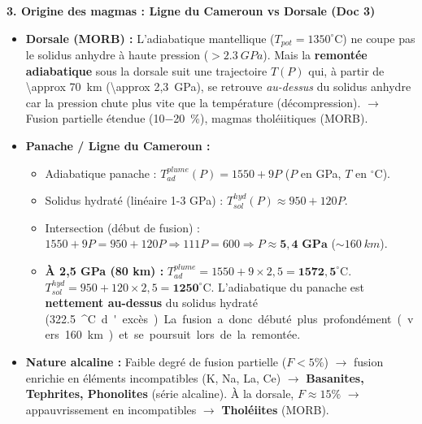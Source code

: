 \documentclass[11pt]{article}
\begin{document}
\begin{exoresolu}
\textbf{3. Origine des magmas : Ligne du Cameroun vs Dorsale (Doc 3)}
\begin{itemize}
    \item \textbf{Dorsale (MORB) :} L'adiabatique mantellique ($T_{pot}=1350^\circ\mathrm{C}$) ne coupe pas le solidus anhydre à haute pression ($> \SI{2,3}{GPa}$). Mais la \textbf{remontée adiabatique} sous la dorsale suit une trajectoire $T(P)$ qui, à partir de \SI{\approx 70}{km} (\SI{\approx 2,3}{GPa}), se retrouve \emph{au-dessus} du solidus anhydre car la pression chute plus vite que la température (décompression). $\rightarrow$ Fusion partielle étendue (\SI{10-20}{\%}), magmas tholéiitiques (MORB).
    \item \textbf{Panache / Ligne du Cameroun :}
    \begin{itemize}
        \item Adiabatique panache : $T_{ad}^{plume}(P) = 1550 + 9P$ ($P$ en GPa, $T$ en $^\circ\mathrm{C}$).
        \item Solidus hydraté (linéaire 1-3 GPa) : $T_{sol}^{hyd}(P) \approx 950 + 120P$.
        \item Intersection (début de fusion) : $1550 + 9P = 950 + 120P \Rightarrow 111P = 600 \Rightarrow P \approx \mathbf{5,4 \text{ GPa}}$ ($\sim \SI{160}{km}$).
        \item \textbf{À 2,5 GPa (80 km) :}
        $T_{ad}^{plume} = 1550 + 9 \times 2,5 = \mathbf{1572,5 ^\circ\mathrm{C}}$.
        $T_{sol}^{hyd} = 950 + 120 \times 2,5 = \mathbf{1250 ^\circ\mathrm{C}}$.
        L'adiabatique du panache est \textbf{nettement au-dessus} du solidus hydraté (\SI{322,5}{^\circ C} d'excès). La fusion a donc débuté plus profondément (vers 160 km) et se poursuit lors de la remontée.
    \end{itemize}
    \item \textbf{Nature alcaline :} Faible degré de fusion partielle ($F < 5\%$) $\rightarrow$ fusion enrichie en éléments incompatibles (K, Na, La, Ce) $\rightarrow$ \textbf{Basanites, Tephrites, Phonolites} (série alcaline). À la dorsale, $F \approx 15\%$ $\rightarrow$ appauvrissement en incompatibles $\rightarrow$ \textbf{Tholéiites} (MORB).
\end{itemize}


\end{exoresolu}
\end{document}
